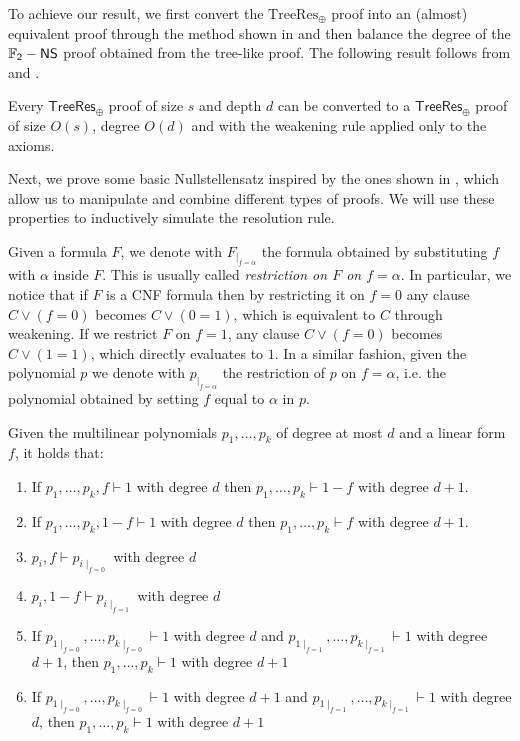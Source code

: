 To achieve our result, we first convert the $\mathrm{TreeRes}_\oplus$ proof into an (almost) equivalent proof through the method shown in  and then balance the degree of the $\mathsf{\mathbb{F}_2-NS}$ proof obtained from the tree-like proof. The following result follows from  and .

\begin{corollary}
    \label{leaf_weakening}
 Every $\mathsf{TreeRes}_{\oplus}$ proof of size $s$ and depth $d$ can be converted to a $\mathsf{TreeRes}_{\oplus}$ proof of size $O(s)$, degree $O(d)$ and with the weakening rule applied only to the axioms.
\end{corollary}

Next, we prove some basic Nullstellensatz inspired by the ones shown in \cite{groebner}, which allow us to manipulate and combine different types of proofs. We will use these properties to inductively simulate the resolution rule.

Given a formula $F$, we denote with $F_{\mid_{f = \alpha}}$ the formula obtained by substituting $f$ with $\alpha$ inside $F$. This is usually called \textit{restriction on $F$ on $f = \alpha$}. In particular, we notice that if $F$ is a CNF formula then by restricting it on $f = 0$ any clause $C \lor (f = 0)$ becomes $C \lor (0 = 1)$, which is equivalent to $C$ through weakening. If we restrict $F$ on $f = 1$, any clause $C \lor (f = 0)$ becomes $C \lor (1=1)$, which directly evaluates to $1$.
In a similar fashion, given the polynomial $p$ we denote with $p_{\mid_{f = \alpha}}$ the restriction of $p$ on $f = \alpha$, i.e. the polynomial obtained by setting $f$ equal to $\alpha$ in $p$.

\begin{lemma}
    \label{ns_properties}
    Given the multilinear polynomials $p_1, \ldots, p_k$ of degree at most $d$ and a linear form $f$, it holds that:
    \begin{enumerate}
        \item If $p_1, \ldots, p_k, f \vdash 1$ with degree $d$ then $p_1, \ldots, p_k \vdash 1-f$ with degree $d+1$.
        \item If $p_1, \ldots, p_k, 1-f \vdash 1$ with degree $d$ then $p_1, \ldots, p_k \vdash f$ with degree $d+1$.
        \item $p_i, f \vdash p_{i \mid_{f=0}}$ with degree $d$ 
        \item $p_i, 1-f \vdash p_{i \mid_{f=1}}$ with degree $d$ 
        \item If $p_{1\mid_{f=0}}, \ldots, p_{k\mid_{f=0}} \vdash 1$ with degree $d$ and $p_{1\mid_{f=1}}, \ldots, p_{k\mid_{f=1}} \vdash 1$ with degree $d+1$, then $p_1, \ldots, p_k \vdash 1$ with degree $d+1$
        \item If $p_{1\mid_{f=0}}, \ldots, p_{k\mid_{f=0}} \vdash 1$ with degree $d+1$ and $p_{1\mid_{f=1}}, \ldots, p_{k\mid_{f=1}} \vdash 1$ with degree $d$, then $p_1, \ldots, p_k \vdash 1$ with degree $d+1$
    \end{enumerate}
\end{lemma}


